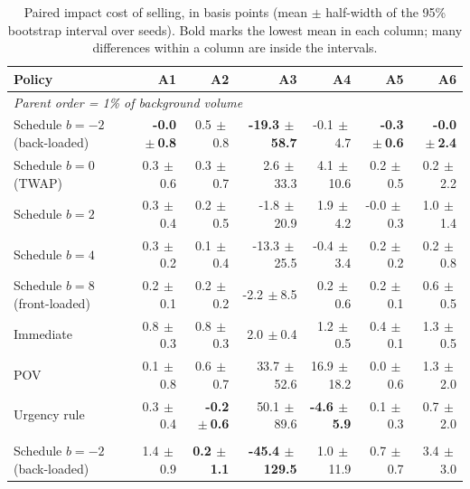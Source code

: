 \begin{table}[!htbp]
\centering\footnotesize
\caption{Paired impact cost of selling, in basis points (mean $\pm$ half-width of the 95\% bootstrap interval over seeds). Bold marks the lowest mean in each column; many differences within a column are inside the intervals.}\label{tab:cost}
\begin{tabular}{lrrrrrr}
\toprule
Policy & A1 & A2 & A3 & A4 & A5 & A6 \\
\midrule
\multicolumn{7}{l}{\emph{Parent order = 1\% of background volume}} \\
Schedule $b=-2$ (back-loaded) & \textbf{-0.0{\tiny$\,\pm$0.8}} & 0.5{\tiny$\,\pm$0.8} & \textbf{-19.3{\tiny$\,\pm$58.7}} & -0.1{\tiny$\,\pm$4.7} & \textbf{-0.3{\tiny$\,\pm$0.6}} & \textbf{-0.0{\tiny$\,\pm$2.4}} \\
Schedule $b=0$ (TWAP) & 0.3{\tiny$\,\pm$0.6} & 0.3{\tiny$\,\pm$0.7} & 2.6{\tiny$\,\pm$33.3} & 4.1{\tiny$\,\pm$10.6} & 0.2{\tiny$\,\pm$0.5} & 0.2{\tiny$\,\pm$2.2} \\
Schedule $b=2$ & 0.3{\tiny$\,\pm$0.4} & 0.2{\tiny$\,\pm$0.5} & -1.8{\tiny$\,\pm$20.9} & 1.9{\tiny$\,\pm$4.2} & -0.0{\tiny$\,\pm$0.3} & 1.0{\tiny$\,\pm$1.4} \\
Schedule $b=4$ & 0.3{\tiny$\,\pm$0.2} & 0.1{\tiny$\,\pm$0.4} & -13.3{\tiny$\,\pm$25.5} & -0.4{\tiny$\,\pm$3.4} & 0.2{\tiny$\,\pm$0.2} & 0.2{\tiny$\,\pm$0.8} \\
Schedule $b=8$ (front-loaded) & 0.2{\tiny$\,\pm$0.1} & 0.2{\tiny$\,\pm$0.2} & -2.2{\tiny$\,\pm$8.5} & 0.2{\tiny$\,\pm$0.6} & 0.2{\tiny$\,\pm$0.1} & 0.6{\tiny$\,\pm$0.5} \\
Immediate & 0.8{\tiny$\,\pm$0.3} & 0.8{\tiny$\,\pm$0.3} & 2.0{\tiny$\,\pm$0.4} & 1.2{\tiny$\,\pm$0.5} & 0.4{\tiny$\,\pm$0.1} & 1.3{\tiny$\,\pm$0.5} \\
POV & 0.1{\tiny$\,\pm$0.8} & 0.6{\tiny$\,\pm$0.7} & 33.7{\tiny$\,\pm$52.6} & 16.9{\tiny$\,\pm$18.2} & 0.0{\tiny$\,\pm$0.6} & 1.3{\tiny$\,\pm$2.0} \\
Urgency rule & 0.3{\tiny$\,\pm$0.4} & \textbf{-0.2{\tiny$\,\pm$0.6}} & 50.1{\tiny$\,\pm$89.6} & \textbf{-4.6{\tiny$\,\pm$5.9}} & 0.1{\tiny$\,\pm$0.3} & 0.7{\tiny$\,\pm$2.0} \\
\addlinespace
\multicolumn{7}{l}{\emph{Parent order = 5\% of background volume}} \\
Schedule $b=-2$ (back-loaded) & 1.4{\tiny$\,\pm$0.9} & \textbf{0.2{\tiny$\,\pm$1.1}} & \textbf{-45.4{\tiny$\,\pm$129.5}} & 1.0{\tiny$\,\pm$11.9} & 0.7{\tiny$\,\pm$0.7} & 3.4{\tiny$\,\pm$3.0} \\

\end{tabular}
\end{table}
